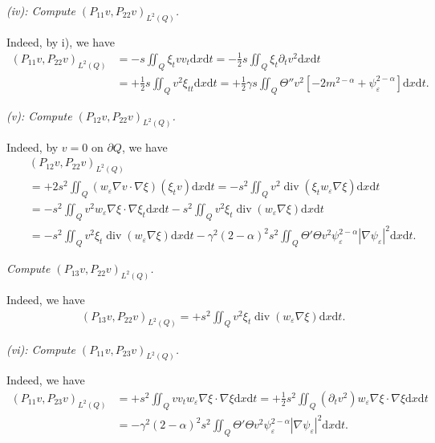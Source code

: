 \documentclass[11pt]{article}
\numberwithin{equation}{section}
\def\df{\mathrm d}
\DeclareMathOperator{\Div}{div}
\begin{document}
{\it (iv): Compute $(P_{11}v, P_{22}v)_{L^2(Q)}$.}

Indeed, by i), we have
\begin{equation*}
\begin{split}
(P_{11}v, P_{22}v)_{L^2(Q)}
&= -s\iint_Q \xi_tvv_t\df x\df t = -\frac{1}{2}s\iint_{Q}\xi_t\partial_t v^2\df x\df t\\
&= +\frac{1}{2}s\iint_Q v^2\xi_{tt}\df x\df t = +\frac{1}{2}\gamma s\iint_Q\Theta'' v^2\left[-2m^{2-\alpha}+\psi_\varepsilon^{2-\alpha}\right]\df x\df t.
\end{split}
\end{equation*}

{\it (v):  Compute $(P_{12}v, P_{22}v)_{L^2(Q)}$.}

Indeed, by $v = 0$ on $\partial Q$, we have
\begin{eqnarray*}
&&(P_{12}v, P_{22}v)_{L^2(Q)}\\
&&= +2s^2\iint_Q(w_\varepsilon\nabla v\cdot \nabla \xi)(\xi_tv)\df x\df t = - s^2\iint_Q v^2\Div(\xi_tw_\varepsilon\nabla\xi)\df x\df t\\
&&= - s^2\iint_Q v^2w_\varepsilon \nabla\xi\cdot\nabla\xi_t\df x\df t - s^2\iint_Q v^2\xi_t \Div(w_\varepsilon \nabla\xi)\df x\df t\\
&&= - s^2\iint_Q v^2\xi_t \Div(w_\varepsilon \nabla\xi)\df x\df t - \gamma^2(2-\alpha)^2s^2\iint_Q \Theta'\Theta v^2\psi_\varepsilon^{2-\alpha}|\nabla\psi_\varepsilon|^2\df x\df t.
\end{eqnarray*}

{\it Compute $(P_{13}v, P_{22}v)_{L^2(Q)}$.}

Indeed, we have
\begin{equation*}
\begin{split}
&(P_{13}v, P_{22}v)_{L^2(Q)}=+s^2\iint_Q v^2\xi_t\Div(w_\varepsilon\nabla\xi)\df x\df t.
\end{split}
\end{equation*}

{\it (vi): Compute $(P_{11}v, P_{23}v)_{L^2(Q)}$.}

Indeed, we have
\begin{equation*}
\begin{split}
(P_{11}v, P_{23}v)_{L^2(Q)}
&= +s^2\iint_Q vv_tw_\varepsilon \nabla\xi\cdot\nabla\xi\df x\df t = +\frac{1}{2}s^2\iint_Q (\partial_t v^2)w_\varepsilon \nabla\xi\cdot\nabla\xi\df x\df t\\
&= - \gamma^2(2-\alpha)^2s^2\iint_Q \Theta'\Theta v^2\psi_\varepsilon^{2-\alpha}|\nabla\psi_\varepsilon|^2\df x\df t.
\end{split}
\end{equation*}
\end{document}
